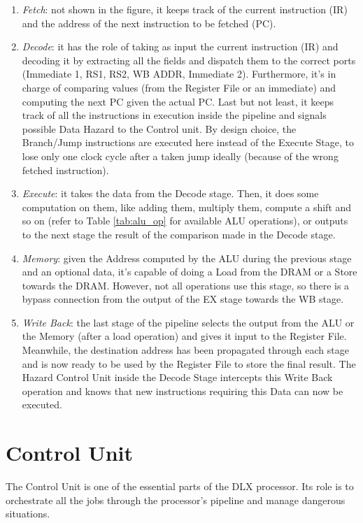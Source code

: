 \begin{enumerate}
    \item \emph{Fetch}: not shown in the figure, it keeps track of the current instruction (IR) and the address of the next instruction to be fetched (PC).
    \item \emph{Decode}: it has the role of taking as input the current instruction (IR) and decoding it by extracting all the fields and dispatch them to the correct ports (Immediate 1, RS1, RS2, WB ADDR, Immediate 2). Furthermore, it's in charge of comparing values (from the Register File or an immediate) and computing the next PC given the actual PC. Last but not least, it keeps track of all the instructions in execution inside the pipeline and signals possible Data Hazard to the Control unit. By design choice, the Branch/Jump instructions are executed here instead of the Execute Stage, to lose only one clock cycle after a taken jump ideally (because of the wrong fetched instruction).
    \item \emph{Execute}: it takes the data from the Decode stage. Then, it does some computation on them, like adding them, multiply them, compute a shift and so on (refer to Table \ref{tab:alu_op} for available ALU operations), or outputs to the next stage the result of the comparison made in the Decode stage.
    \item \emph{Memory}: given the Address computed by the ALU during the previous stage and an optional data, it's capable of doing a Load from the DRAM or a Store towards the DRAM. However, not all operations use this stage, so there is a bypass connection from the output of the EX stage towards the WB stage.
    \item \emph{Write Back}: the last stage of the pipeline selects the output from the ALU or the Memory (after a load operation) and gives it input to the Register File. Meanwhile, the destination address has been propagated through each stage and is now ready to be used by the Register File to store the final result. The Hazard Control Unit inside the Decode Stage intercepts this Write Back operation and knows that new instructions requiring this Data can now be executed.
\end{enumerate}


\section{Control Unit}

The Control Unit is one of the essential parts of the DLX processor. Its role is to orchestrate all the jobs through the processor's pipeline and manage dangerous situations.\\

